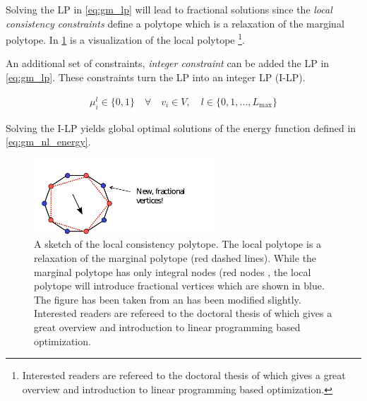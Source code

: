 Solving the LP in \cref{eq:gm_lp} will lead to fractional
solutions since the \emph{local consistency constraints} 
define a polytope which is a relaxation
of the marginal polytope.
In \cref{fig:local_poly} is a visualization of the local
polytope \footnote{
Interested readers are refereed to the doctoral
thesis of  \citet{sontag_2010_thesis} which gives
a great overview and introduction to linear programming
based optimization.
}.

An additional set of constraints, \emph{integer constraint} can be added the LP in \cref{eq:gm_lp}. These constraints turn the LP into an integer LP (I-LP).

\begin{align}
    \mu_i^l \in \{0,1\} \quad \forall \quad v_{i} \in V,
    \quad l \in \{ 0,1,\ldots,L_{\text{max}} \} \label{eq:integral_constraint}
\end{align}

Solving the I-LP yields
global optimal solutions of the energy function defined in 
\cref{eq:gm_nl_energy}.







\begin{figure}[H]
\centering
\includegraphics[width=0.6\textwidth]{fig/frac_vert2.pdf}
\caption{
    A sketch of the local consistency polytope.
    The local polytope is a relaxation
    of the marginal polytope (red dashed lines).
    While the marginal polytope has only integral
    nodes (red nodes , the local polytope 
    will introduce fractional vertices which are shown
    in blue.
    The figure has been taken from \citep{sontag_2010_thesis}
    an has been modified slightly.
    Interested readers are refereed to the doctoral
    thesis of  \citet{sontag_2010_thesis} which gives
    a great overview and introduction to linear programming
    based optimization.
}\label{fig:local_poly}
\end{figure}





